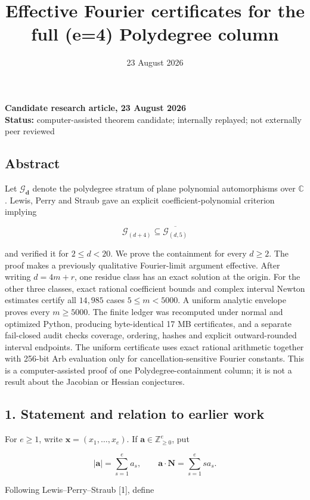 \documentclass[
  11pt,
  a4paper,
]{article}
\title{Effective Fourier certificates for the full (e=4) Polydegree
column}
\author{}
\date{23 August 2026}
\begin{document}
\maketitle

\textbf{Candidate research article, 23 August 2026}\\
\textbf{Status:} computer-assisted theorem candidate; internally
replayed; not externally peer reviewed

\subsection{Abstract}\label{abstract}

Let \(\mathcal G_{\mathbf d}\) denote the polydegree stratum of plane
polynomial automorphisms over \(\mathbb C\). Lewis, Perry and Straub
gave an explicit coefficient-polynomial criterion implying

\[
\mathcal G_{(d+4)}\subseteq\overline{\mathcal G_{(d,5)}}
\]

and verified it for \(2\le d<20\). We prove the containment for every
\(d\ge2\). The proof makes a previously qualitative Fourier-limit
argument effective. After writing \(d=4m+r\), one residue class has an
exact solution at the origin. For the other three classes, exact
rational coefficient bounds and complex interval Newton estimates
certify all \(14{,}985\) cases \(5\le m<5000\). A uniform analytic
envelope proves every \(m\ge5000\). The finite ledger was recomputed
under normal and optimized Python, producing byte-identical 17 MB
certificates, and a separate fail-closed audit checks coverage,
ordering, hashes and explicit outward-rounded interval endpoints. The
uniform certificate uses exact rational arithmetic together with 256-bit
Arb evaluation only for cancellation-sensitive Fourier constants. This
is a computer-assisted proof of one Polydegree-containment column; it is
not a result about the Jacobian or Hessian conjectures.

\subsection{1. Statement and relation to earlier
work}\label{statement-and-relation-to-earlier-work}

For \(e\ge1\), write \(\mathbf x=(x_1,\ldots,x_e)\). If
\(\mathbf a\in\mathbb Z_{\ge0}^e\), put

\[
|\mathbf a|=\sum_{s=1}^e a_s,
\qquad
\mathbf a\cdot\mathbf N=\sum_{s=1}^e s a_s.
\]

Following Lewis--Perry--Straub {[}1{]}, define
\end{document}
